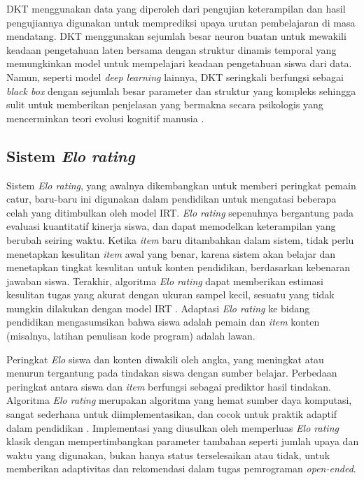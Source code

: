 DKT menggunakan data yang diperoleh dari 
pengujian keterampilan dan hasil pengujiannya digunakan untuk memprediksi upaya 
urutan pembelajaran di masa mendatang. DKT menggunakan sejumlah besar neuron buatan 
untuk mewakili keadaan pengetahuan laten bersama dengan struktur dinamis temporal 
yang memungkinkan model untuk mempelajari keadaan pengetahuan siswa dari data. Namun,
seperti model \textit{deep learning} lainnya, DKT seringkali berfungsi sebagai 
\textit{black box} dengan sejumlah besar parameter dan struktur yang kompleks
sehingga sulit untuk memberikan penjelasan yang bermakna secara psikologis yang 
mencerminkan teori evolusi kognitif manusia \autocite{Minn2022}.

\subsection{Sistem \textit{Elo rating}}
Sistem \textit{Elo rating}, yang awalnya dikembangkan untuk memberi peringkat
pemain catur, baru-baru ini digunakan dalam pendidikan untuk mengatasi beberapa
celah yang ditimbulkan oleh model IRT. \textit{Elo rating} sepenuhnya bergantung
pada evaluasi kuantitatif kinerja siswa, dan dapat memodelkan keterampilan yang
berubah seiring waktu. Ketika \textit{item} baru ditambahkan dalam sistem, tidak
perlu menetapkan kesulitan \textit{item} awal yang benar, karena sistem akan belajar
dan menetapkan tingkat kesulitan untuk konten pendidikan, berdasarkan kebenaran
jawaban siswa. Terakhir, algoritma \textit{Elo rating} dapat memberikan estimasi
kesulitan tugas yang akurat dengan ukuran sampel kecil, sesuatu yang tidak mungkin
dilakukan dengan model IRT \autocite{Vesin2022}. Adaptasi \textit{Elo rating} ke
bidang pendidikan mengasumsikan bahwa siswa adalah pemain dan \textit{item} konten
(misalnya, latihan penulisan kode program) adalah lawan.

Peringkat \textit{Elo} siswa
dan konten diwakili oleh angka, yang meningkat atau menurun tergantung pada tindakan
siswa dengan sumber belajar. Perbedaan peringkat antara siswa dan \textit{item}
berfungsi sebagai prediktor hasil tindakan. Algoritma \textit{Elo rating} merupakan
algoritma yang hemat sumber daya komputasi, sangat sederhana untuk diimplementasikan,
dan cocok untuk praktik adaptif dalam pendidikan \autocite{Vesin2022}. Implementasi
yang diusulkan oleh \textcite{Vesin2022} memperluas \textit{Elo rating} klasik dengan
mempertimbangkan parameter tambahan seperti jumlah upaya dan waktu yang digunakan, 
bukan hanya status terselesaikan atau tidak, untuk memberikan adaptivitas dan
rekomendasi dalam tugas pemrograman \textit{open-ended}.

